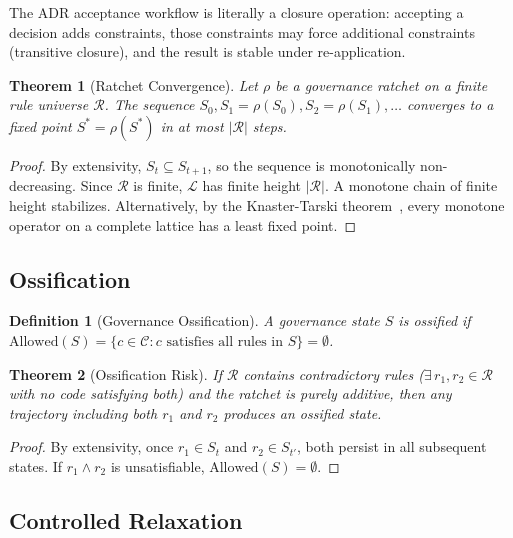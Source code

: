 \documentclass[11pt, a4paper, logo, copyright]{googledeepmind}
\newtheorem{definition}{Definition}[section]
\newtheorem{theorem}{Theorem}[section]
\begin{document}
The ADR acceptance workflow is literally a closure operation: accepting a decision adds constraints, those constraints may force additional constraints (transitive closure), and the result is stable under re-application.

\begin{theorem}[Ratchet Convergence]
\label{thm:ratchet}
Let $\rho$ be a governance ratchet on a finite rule universe $\mathcal{R}$. The sequence $S_0, S_1 = \rho(S_0), S_2 = \rho(S_1), \ldots$ converges to a fixed point $S^* = \rho(S^*)$ in at most $|\mathcal{R}|$ steps.
\end{theorem}

\begin{proof}
By extensivity, $S_t \subseteq S_{t+1}$, so the sequence is monotonically non-decreasing. Since $\mathcal{R}$ is finite, $\mathcal{L}$ has finite height $|\mathcal{R}|$. A monotone chain of finite height stabilizes. Alternatively, by the Knaster-Tarski theorem~\citep{tarski1955}, every monotone operator on a complete lattice has a least fixed point.
\end{proof}

\subsection{Ossification}

\begin{definition}[Governance Ossification]
A governance state $S$ is \emph{ossified} if $\mathrm{Allowed}(S) = \{c \in \mathcal{C} : c \text{ satisfies all rules in } S\} = \emptyset$.
\end{definition}

\begin{theorem}[Ossification Risk]
\label{thm:ossification}
If $\mathcal{R}$ contains contradictory rules ($\exists\, r_1, r_2 \in \mathcal{R}$ with no code satisfying both) and the ratchet is purely additive, then any trajectory including both $r_1$ and $r_2$ produces an ossified state.
\end{theorem}

\begin{proof}
By extensivity, once $r_1 \in S_t$ and $r_2 \in S_{t'}$, both persist in all subsequent states. If $r_1 \wedge r_2$ is unsatisfiable, $\mathrm{Allowed}(S) = \emptyset$.
\end{proof}

\subsection{Controlled Relaxation}
\end{document}
